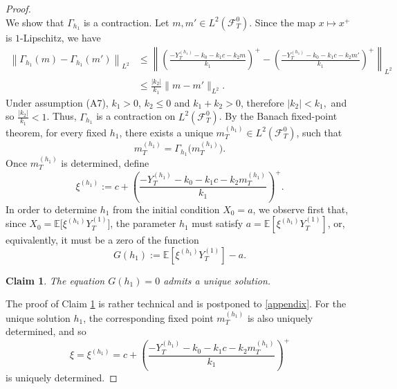 \documentclass[11pt,a4paper]{article}
\newtheorem{claim}[theo]{Claim}
\begin{document}
\begin{proof}
\begin{equation}
\end{equation}
We show that \(\Gamma_{h_1}\) is a contraction. Let \(m,m'\in L^2(\mathcal F_T^0)\). Since the map \(x\mapsto x^+\) is \(1\)-Lipschitz, we have
\begin{equation}
\label{contractionestimate}
  \begin{aligned}
\left\| \Gamma_{h_1}(m)-\Gamma_{h_1}(m')\right\|_{L^2}
&\le\left\|\left(\frac{-Y_T^{(h_1)}-k_0-k_1c-k_2m}{k_1}\right)^+-\left(\frac{-Y_T^{(h_1)}-k_0-k_1c-k_2m'}{k_1}\right)^+\right\|_{L^2}\\
&\le \frac{|k_2|}{k_1} \|m-m'\|_{L^2}.
\end{aligned}  
\end{equation}
Under assumption (A7), $k_1>0$, $k_2\leq 0$ and $k_1+k_2>0$,
therefore $|k_2|<k_1,$ and so
$\frac{|k_2|}{k_1}<1$.
Thus, \(\Gamma_{h_1}\) is a contraction on \(L^2(\mathcal F_T^0)\). By the Banach fixed-point theorem, for every fixed \(h_1\), there exists a unique $m_T^{(h_1)}\in L^2(\mathcal F_T^0)$, such that
\[
m_T^{(h_1)}=\Gamma_{h_1}\big(m_T^{(h_1)}\big).
\]
Once \(m_T^{(h_1)}\) is determined, define
\begin{equation}
\label{xih1}
\xi^{(h_1)}:=c+\left(\frac{-Y_T^{(h_1)}-k_0-k_1c-k_2m_T^{(h_1)}}{k_1}\right)^+.
\end{equation}
In order to determine \(h_1\) from the initial condition \(X_0=a\), we observe first that, since $X_0=\mathbb E\big[\xi^{(h_1)}Y_T^{(1)}\big]$,
the parameter \(h_1\) must satisfy
$a=\mathbb E [\xi^{(h_1)}Y_T^{(1)}]$,
or, equivalently, it must be a zero of the function
\[
G(h_1):=\mathbb E\left[\xi^{(h_1)}Y_T^{(1)} \right]-a.
\]
\begin{claim}\label{claim:h1}
The equation \(G(h_1)=0\) admits a unique solution.
\end{claim}
\noindent The proof of Claim \ref{claim:h1} is rather technical and is postponed to  \ref{appendix}.
 For the unique solution \(h_1\), the corresponding fixed point
\(m_T^{(h_1)}\) is also uniquely determined, and so
\[
\xi=\xi^{(h_1)}=c+\left(\frac{
-Y_T^{(h_1)}-k_0-k_1c-k_2m_T^{(h_1)}
}{k_1}
\right)^+
\]
is uniquely determined.


\end{proof}
\end{document}

